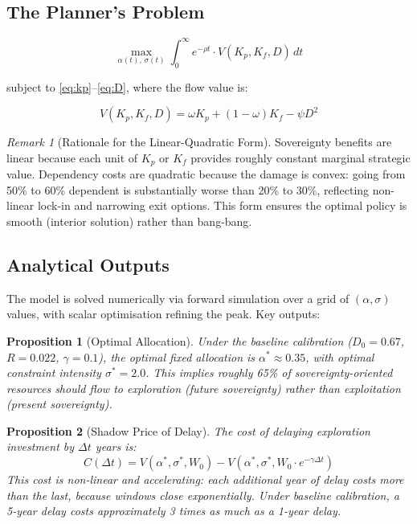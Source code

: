 \documentclass[11pt,a4paper]{article}
\newtheorem{proposition}{Proposition}
\theoremstyle{remark}
\newtheorem{remark}{Remark}
\begin{document}
\subsection{The Planner's Problem}

\begin{equation}
\max_{\alpha(t),\, \sigma(t)} \int_0^{\infty} e^{-\rho t} \cdot V(K_p, K_f, D)\, dt
\label{eq:planner}
\end{equation}

subject to \eqref{eq:kp}--\eqref{eq:D}, where the flow value is:

\begin{equation}
V(K_p, K_f, D) = \omega K_p + (1-\omega)K_f - \psi D^2
\label{eq:value}
\end{equation}

\begin{remark}[Rationale for the Linear-Quadratic Form]
Sovereignty benefits are linear because each unit of $K_p$ or $K_f$ provides roughly constant marginal strategic value. Dependency costs are quadratic because the damage is convex: going from 50\% to 60\% dependent is substantially worse than 20\% to 30\%, reflecting non-linear lock-in and narrowing exit options. This form ensures the optimal policy is smooth (interior solution) rather than bang-bang.
\end{remark}

\subsection{Analytical Outputs}

The model is solved numerically via forward simulation over a grid of $(\alpha, \sigma)$ values, with scalar optimisation refining the peak. Key outputs:

\begin{proposition}[Optimal Allocation]
Under the baseline calibration ($D_0 = 0.67$, $R = 0.022$, $\gamma = 0.1$), the optimal fixed allocation is $\alpha^* \approx 0.35$, with optimal constraint intensity $\sigma^* = 2.0$. This implies roughly 65\% of sovereignty-oriented resources should flow to exploration (future sovereignty) rather than exploitation (present sovereignty).
\end{proposition}

\begin{proposition}[Shadow Price of Delay]
The cost of delaying exploration investment by $\Delta t$ years is:
\begin{equation}
C(\Delta t) = V(\alpha^*, \sigma^*, W_0) - V(\alpha^*, \sigma^*, W_0 \cdot e^{-\gamma \Delta t})
\end{equation}
This cost is non-linear and accelerating: each additional year of delay costs more than the last, because windows close exponentially. Under baseline calibration, a 5-year delay costs approximately 3 times as much as a 1-year delay.
\end{proposition}
\end{document}

